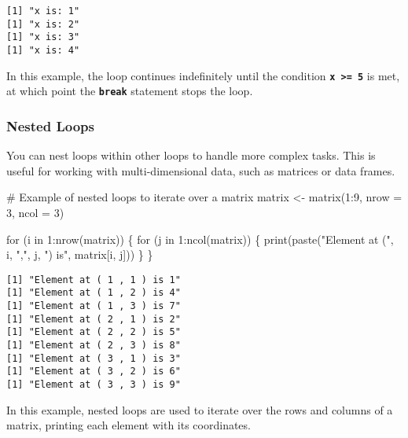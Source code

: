 \documentclass[
  letterpaper,
  DIV=11,
  numbers=noendperiod]{scrartcl}
\newenvironment{Shaded}{\begin{snugshade}}{\end{snugshade}}
\newcommand{\AttributeTok}[1]{\textcolor[rgb]{0.40,0.45,0.13}{#1}}
\newcommand{\CommentTok}[1]{\textcolor[rgb]{0.37,0.37,0.37}{#1}}
\newcommand{\ControlFlowTok}[1]{\textcolor[rgb]{0.00,0.23,0.31}{#1}}
\newcommand{\DecValTok}[1]{\textcolor[rgb]{0.68,0.00,0.00}{#1}}
\newcommand{\FunctionTok}[1]{\textcolor[rgb]{0.28,0.35,0.67}{#1}}
\newcommand{\NormalTok}[1]{\textcolor[rgb]{0.00,0.23,0.31}{#1}}
\newcommand{\OtherTok}[1]{\textcolor[rgb]{0.00,0.23,0.31}{#1}}
\newcommand{\SpecialCharTok}[1]{\textcolor[rgb]{0.37,0.37,0.37}{#1}}
\newcommand{\StringTok}[1]{\textcolor[rgb]{0.13,0.47,0.30}{#1}}
\begin{document}
\begin{verbatim}
[1] "x is: 1"
[1] "x is: 2"
[1] "x is: 3"
[1] "x is: 4"
\end{verbatim}

In this example, the loop continues indefinitely until the condition
\textbf{\texttt{x\ \textgreater{}=\ 5}} is met, at which point the
\textbf{\texttt{break}} statement stops the loop.

\hypertarget{nested-loops}{%
\subsubsection{Nested Loops}\label{nested-loops}}

You can nest loops within other loops to handle more complex tasks. This
is useful for working with multi-dimensional data, such as matrices or
data frames.

\begin{Shaded}
\begin{Highlighting}[]
\CommentTok{\# Example of nested loops to iterate over a matrix}
\NormalTok{matrix }\OtherTok{\textless{}{-}} \FunctionTok{matrix}\NormalTok{(}\DecValTok{1}\SpecialCharTok{:}\DecValTok{9}\NormalTok{, }\AttributeTok{nrow =} \DecValTok{3}\NormalTok{, }\AttributeTok{ncol =} \DecValTok{3}\NormalTok{)}

\ControlFlowTok{for}\NormalTok{ (i }\ControlFlowTok{in} \DecValTok{1}\SpecialCharTok{:}\FunctionTok{nrow}\NormalTok{(matrix)) \{}
  \ControlFlowTok{for}\NormalTok{ (j }\ControlFlowTok{in} \DecValTok{1}\SpecialCharTok{:}\FunctionTok{ncol}\NormalTok{(matrix)) \{}
    \FunctionTok{print}\NormalTok{(}\FunctionTok{paste}\NormalTok{(}\StringTok{"Element at ("}\NormalTok{, i, }\StringTok{","}\NormalTok{, j, }\StringTok{") is"}\NormalTok{, matrix[i, j]))}
\NormalTok{  \}}
\NormalTok{\}}
\end{Highlighting}
\end{Shaded}

\begin{verbatim}
[1] "Element at ( 1 , 1 ) is 1"
[1] "Element at ( 1 , 2 ) is 4"
[1] "Element at ( 1 , 3 ) is 7"
[1] "Element at ( 2 , 1 ) is 2"
[1] "Element at ( 2 , 2 ) is 5"
[1] "Element at ( 2 , 3 ) is 8"
[1] "Element at ( 3 , 1 ) is 3"
[1] "Element at ( 3 , 2 ) is 6"
[1] "Element at ( 3 , 3 ) is 9"
\end{verbatim}

In this example, nested loops are used to iterate over the rows and
columns of a matrix, printing each element with its coordinates.
\end{document}
